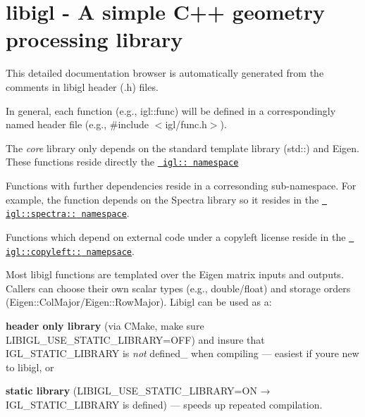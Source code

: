 \chapter{libigl -\/ A simple C++ geometry processing library}
\hypertarget{index}{}\label{index}
\label{index_md_docs_2index}%
%
 This detailed documentation browser is automatically generated from the comments in libigl header (.h) files.

In general, each function (e.\+g., {\ttfamily igl\+::func}) will be defined in a correspondingly named header file (e.\+g., {\ttfamily \#include \texorpdfstring{$<$}{<}igl/func.\+h\texorpdfstring{$>$}{>}}).

The {\itshape core} library only depends on the standard template library ({\ttfamily std\+:\+:}) and Eigen. These functions reside directly the \href{./namespaceigl.html}{\texttt{ {\ttfamily igl\+:\+:} namespace}}

Functions with further dependencies reside in a corresonding sub-\/namespace. For example, the function {\ttfamily {}} depends on the Spectra library so it resides in the \href{./namespaceigl_1_1spectra.html}{\texttt{ {\ttfamily igl\+::spectra\+:\+:} namespace}}.

Functions which depend on external code under a copyleft license reside in the \href{file:///Users/alecjacobson/Repos/libigl/dox/namespaceigl_1_1copyleft.html}{\texttt{ {\ttfamily igl\+::copyleft\+:\+:} namepsace}}.

Most libigl functions are templated over the Eigen matrix inputs and outputs. Callers can choose their own scalar types (e.\+g., {\ttfamily double}/{\ttfamily float}) and storage orders ({\ttfamily Eigen\+::\+Col\+Major}/{\ttfamily Eigen\+::\+Row\+Major}). Libigl can be used as a\+:


\begin{DoxyItemize}
\item {\bfseries{header only library}} (via CMake, make sure {\ttfamily LIBIGL\+\_\+\+USE\+\_\+\+STATIC\+\_\+\+LIBRARY=OFF}) and insure that {\ttfamily IGL\+\_\+\+STATIC\+\_\+\+LIBRARY} is {\itshape not} defined\+\_\+ when compiling --- easiest if you\textquotesingle{}re new to libigl, or
\item {\bfseries{static library}} ({\ttfamily LIBIGL\+\_\+\+USE\+\_\+\+STATIC\+\_\+\+LIBRARY=ON} → {\ttfamily IGL\+\_\+\+STATIC\+\_\+\+LIBRARY} is defined) --- speeds up repeated compilation.
\end{DoxyItemize}


